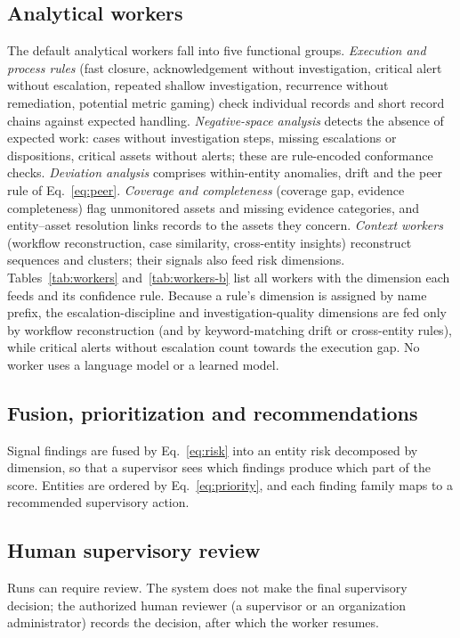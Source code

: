 

\subsection{Analytical workers}
The  default analytical workers fall into five functional groups.
\emph{Execution and process rules} (fast closure, acknowledgement without
investigation, critical alert without escalation, repeated shallow investigation,
recurrence without remediation, potential metric gaming) check individual records and
short record chains against expected handling. \emph{Negative-space analysis} detects
the absence of expected work: cases without investigation steps, missing escalations
or dispositions, critical assets without alerts; these are rule-encoded conformance
checks. \emph{Deviation analysis} comprises within-entity anomalies, drift and the peer
rule of Eq.~\eqref{eq:peer}. \emph{Coverage and completeness} (coverage gap, evidence
completeness) flag unmonitored assets and missing evidence categories, and
entity--asset resolution links records to the assets they concern. \emph{Context workers} (workflow reconstruction, case similarity,
cross-entity insights) reconstruct sequences and clusters; their signals also feed risk
dimensions. Tables~\ref{tab:workers} and~\ref{tab:workers-b} list all  workers with the
dimension each feeds and its confidence rule. Because a rule's dimension is assigned by
name prefix, the escalation-discipline and investigation-quality dimensions are fed only
by workflow reconstruction (and by keyword-matching drift or cross-entity rules), while
critical alerts without escalation count towards the execution gap. No worker uses a
language model or a learned model.



\subsection{Fusion, prioritization and recommendations}
Signal findings are fused by Eq.~\eqref{eq:risk} into an entity risk decomposed by
dimension, so that a supervisor sees which findings produce which part of the score.
Entities are ordered by Eq.~\eqref{eq:priority}, and each finding family maps to a
recommended supervisory action.

\subsection{Human supervisory review}
Runs can require review. The system does not make the final supervisory decision; the
authorized human reviewer (a supervisor or an organization administrator) records the
decision, after which the worker resumes.

